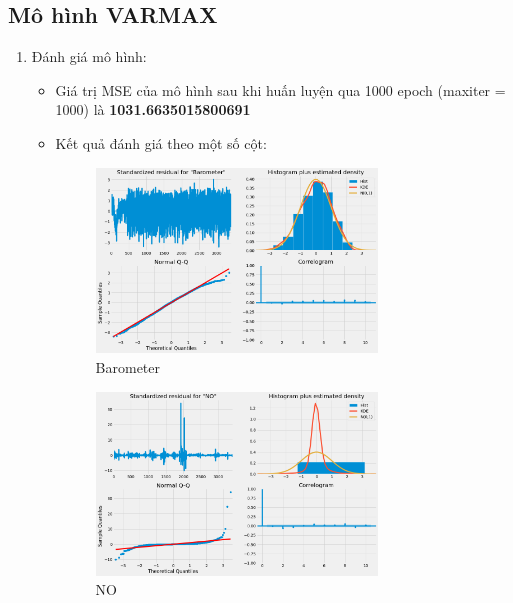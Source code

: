 \subsection{Mô hình VARMAX}
\begin{enumerate}
    \item Đánh giá mô hình:
    \begin{itemize}
    \item Giá trị MSE của mô hình sau khi huấn luyện qua 1000 epoch (maxiter = 1000) là \textbf{1031.6635015800691} 

    \item Kết quả đánh giá theo một số cột:
    \begin{figure}[H]
        \centering
        \includegraphics[width=0.75\textwidth]{figures/danhgia1.png}
        \caption[Barometer]{Barometer}
    \end{figure}


    \begin{figure}[H]
        \centering
        \includegraphics[width=0.75\textwidth]{figures/danhgia3.png}
        \caption[NO]{NO}
    \end{figure}
    

\end{itemize}
\end{enumerate}
